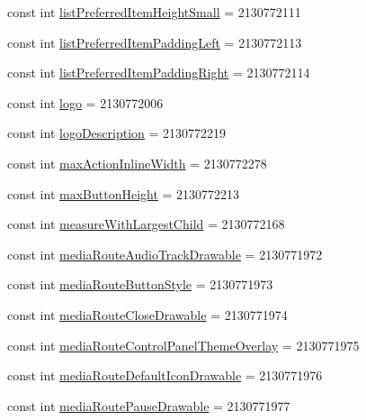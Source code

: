 \begin{CompactItemize}
\item 
const int \hyperlink{class__2doo_1_1_droid_1_1_resource_1_1_attribute_864d6ecc0d0cbfa97efdb32b448b4252}{listPreferredItemHeightSmall} = 2130772111
\item 
const int \hyperlink{class__2doo_1_1_droid_1_1_resource_1_1_attribute_fa948f45a04322d8985dd10c8383d466}{listPreferredItemPaddingLeft} = 2130772113
\item 
const int \hyperlink{class__2doo_1_1_droid_1_1_resource_1_1_attribute_d97c4cf8989d5e17218ebd782e928fac}{listPreferredItemPaddingRight} = 2130772114
\item 
const int \hyperlink{class__2doo_1_1_droid_1_1_resource_1_1_attribute_41e5bc0f19f4397091087bb1d9f67528}{logo} = 2130772006
\item 
const int \hyperlink{class__2doo_1_1_droid_1_1_resource_1_1_attribute_0ce0e3a921d775a79a2c8017b7c9d7c2}{logoDescription} = 2130772219
\item 
const int \hyperlink{class__2doo_1_1_droid_1_1_resource_1_1_attribute_0bd69ce31571df224793eaf98adc1a9f}{maxActionInlineWidth} = 2130772278
\item 
const int \hyperlink{class__2doo_1_1_droid_1_1_resource_1_1_attribute_1bc19d69afc3c5532acdcc18083c7da7}{maxButtonHeight} = 2130772213
\item 
const int \hyperlink{class__2doo_1_1_droid_1_1_resource_1_1_attribute_0872c2dbb6e059c0219555216475d0df}{measureWithLargestChild} = 2130772168
\item 
const int \hyperlink{class__2doo_1_1_droid_1_1_resource_1_1_attribute_8dfb9d2ec53e990e751f5c20b64651ac}{mediaRouteAudioTrackDrawable} = 2130771972
\item 
const int \hyperlink{class__2doo_1_1_droid_1_1_resource_1_1_attribute_5adb7486f286e08bfa84d059d8986cd4}{mediaRouteButtonStyle} = 2130771973
\item 
const int \hyperlink{class__2doo_1_1_droid_1_1_resource_1_1_attribute_264b307398a55b3695873b0197dbe95b}{mediaRouteCloseDrawable} = 2130771974
\item 
const int \hyperlink{class__2doo_1_1_droid_1_1_resource_1_1_attribute_fd6f799f8a3e18b45a9feb798e1856fe}{mediaRouteControlPanelThemeOverlay} = 2130771975
\item 
const int \hyperlink{class__2doo_1_1_droid_1_1_resource_1_1_attribute_2868b96d7a832f2c94f0475aa2ef6c0c}{mediaRouteDefaultIconDrawable} = 2130771976
\item 
const int \hyperlink{class__2doo_1_1_droid_1_1_resource_1_1_attribute_9a828b725b719b16c72543442db7efe5}{mediaRoutePauseDrawable} = 2130771977

\end{CompactItemize}
